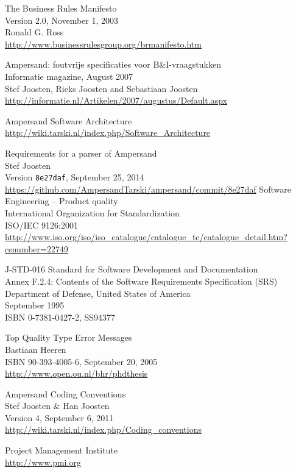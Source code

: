 \label{sec:bibliography}

\begin{thebibliography}{99}

	The Business Rules Manifesto\\
	Version 2.0, November 1, 2003\\
	Ronald G. Ross\\
	\url{http://www.businessrulesgroup.org/brmanifesto.htm}

	Ampersand: foutvrije specificaties voor B\&I-vraagstukken\\
	Informatie magazine, August 2007\\
	Stef Joosten, Rieks Joosten and Sebastiaan Joosten\\
	\url{http://informatie.nl/Artikelen/2007/augustus/Default.aspx}  %

	Ampersand Software Architecture\\
	\url{http://wiki.tarski.nl/index.php/Software_Architecture}

	Requirements for a parser of Ampersand\\
	Stef Joosten\\
	Version \texttt{8e27daf}, September 25, 2014\\
	\url{https://github.com/AmpersandTarski/ampersand/commit/8e27daf}
	Software Engineering -- Product quality\\
	International Organization for Standardization\\
	ISO/IEC 9126:2001\\
	\url{http://www.iso.org/iso/iso_catalogue/catalogue_tc/catalogue_detail.htm?csnumber=22749}

	J-STD-016 Standard for Software Development and Documentation\\
	Annex F.2.4: Contents of the Software Requirements Specification (SRS)\\
	Department of Defense, United States of America\\
	September 1995\\
	ISBN 0-7381-0427-2, SS94377

	Top Quality Type Error Messages\\
	Bastiaan Heeren\\
	ISBN 90-393-4005-6, September 20, 2005\\
	\url{http://www.open.ou.nl/bhr/phdthesis}

	Ampersand Coding Conventions\\
	Stef Joosten \& Han Joosten\\
	Version 4, September 6, 2011\\
	\url{http://wiki.tarski.nl/index.php/Coding\_conventions}

	Project Management Institute\\
	\url{http://www.pmi.org}

\end{thebibliography}
